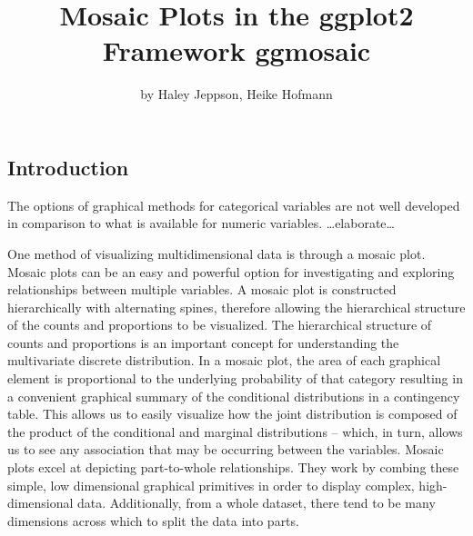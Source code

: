 \title{Mosaic Plots in the ggplot2 Framework ggmosaic}
\author{by Haley Jeppson, Heike Hofmann}

\maketitle


\subsection{Introduction}\label{introduction}

The options of graphical methods for categorical variables are not well
developed in comparison to what is available for numeric variables.
\ldots{}elaborate\ldots{}

One method of visualizing multidimensional data is through a mosaic
plot. Mosaic plots can be an easy and powerful option for investigating
and exploring relationships between multiple variables. A mosaic plot is
constructed hierarchically with alternating spines, therefore allowing
the hierarchical structure of the counts and proportions to be
visualized. The hierarchical structure of counts and proportions is an
important concept for understanding the multivariate discrete
distribution. In a mosaic plot, the area of each graphical element is
proportional to the underlying probability of that category resulting in
a convenient graphical summary of the conditional distributions in a
contingency table. This allows us to easily visualize how the joint
distribution is composed of the product of the conditional and marginal
distributions -- which, in turn, allows us to see any association that
may be occurring between the variables. Mosaic plots excel at depicting
part-to-whole relationships. They work by combing these simple, low
dimensional graphical primitives in order to display complex,
high-dimensional data. Additionally, from a whole dataset, there tend to
be many dimensions across which to split the data into parts.

